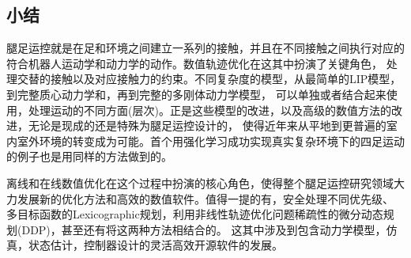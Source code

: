 \subsection{小结}
腿足运控就是在足和环境之间建立一系列的接触，并且在不同接触之间执行对应的符合机器人运动学和动力学的动作。数值轨迹优化在这其中扮演了关键角色，
处理交替的接触以及对应接触力的约束。不同复杂度的模型，从最简单的LIP模型，到完整质心动力学和，再到完整的多刚体动力学模型，
可以单独或者结合起来使用，处理运动的不同方面(层次)。正是这些模型的改进，以及高级的数值方法的改进，无论是现成的还是特殊为腿足运控设计的，
使得近年来从平地到更普遍的室内室外环境的转变成为可能。首个用强化学习成功实现真实复杂环境下的四足运动的例子也是用同样的方法做到的。

离线和在线数值优化在这个过程中扮演的核心角色，使得整个腿足运控研究领域大力发展新的优化方法和高效的数值软件。值得一提的有，安全处理不同优先级、
多目标函数的Lexicographic规划，利用非线性轨迹优化问题稀疏性的微分动态规划(DDP)，甚至还有将这两种方法相结合的\cite{geisert2017regularized}。
这其中涉及到包含动力学模型\cite{felis2017rbdl}，仿真\cite{lee2018dart}，状态估计\cite{camurri2020pronto}，控制器设计\cite{tedrake2019drake}的灵活高效开源软件的发展。



